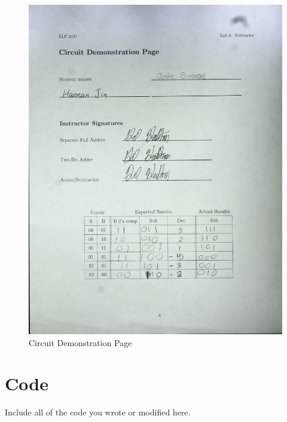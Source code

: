 \documentclass[11pt]{article}
\begin{document}
\begin{center}
	\begin{figure}
		\includegraphics[width=1\textwidth]{KIC_Document.pdf}
		\caption{Circuit Demonstration Page}
	\end{figure}
\end{center}

\clearpage
\section*{Code}

Include all of the code you wrote or modified here.
\end{document}
